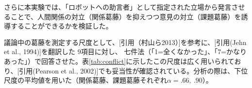 \documentclass[11pt, a4paper]{jreport} %
\begin{document}



さらに本実験では、「ロボットへの助言者」として指定された立場から発言させることで、人間関係の対立（関係葛藤）を抑えつつ意見の対立（課題葛藤）を誘導することができるかを検証した。


議論中の葛藤を測定する尺度として、[引用（村山ら2013）]を参考に、[引用(Jehn et al., 1994)]を翻訳した
9項目に対し、
七件法（「1=全くなかった」、「7=かなりあった」）で回答させた。表\ref{tab:conflict}に示したこの尺度は広く用いられており、[引用(Pearson et al., 2002)]でも妥当性が確認されている。分析の際は、下位尺度の平均値を用いた（関係葛藤、課題葛藤それぞれ$\alpha=.66,~.90$）。

\end{document}
